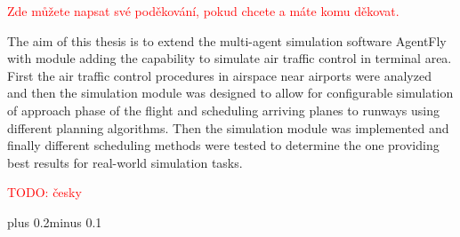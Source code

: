 \documentclass[11pt,oneside,a4paper]{book}
\newcommand{\red}[1] {\textcolor{red}{#1}}
\begin{document}

\coverpagestarts

\acknowledgements
\noindent
\red{Zde můžete napsat své poděkování, pokud chcete a máte komu děkovat.}



 
\abstractpage
The aim of this thesis is to extend the multi-agent simulation software AgentFly with module adding the capability to simulate air traffic control in terminal area. First the air traffic control procedures in airspace near airports were analyzed and then the simulation module was designed to allow for configurable simulation of approach phase of the flight and scheduling arriving planes to runways using different planning algorithms. Then the simulation module was implemented and finally different scheduling methods were tested to determine the one providing best results for real-world simulation tasks.


\baselineskip
\noindent
\red{TODO: česky}


\tableofcontents
\listoffigures
\listoftables


\mainbodystarts
\normalfont
{}\baselineskip plus 0.2\baselineskip minus 0.1\baselineskip














\end{document}
